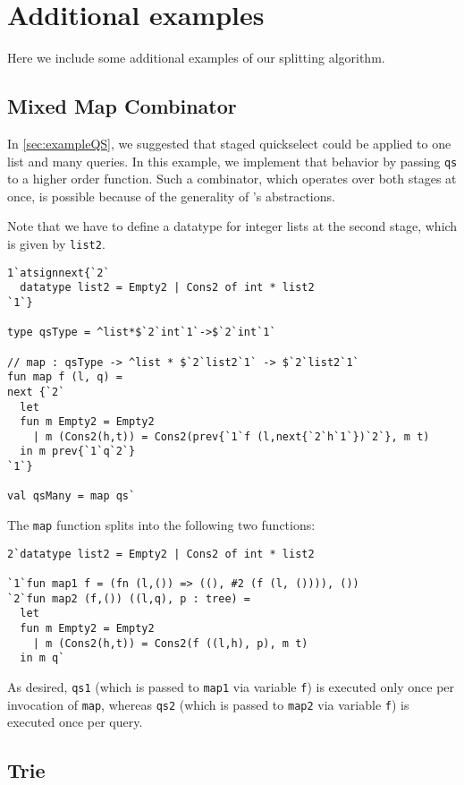 
\section{Additional examples}

Here we include some additional examples of our splitting algorithm.

\subsection {Mixed Map Combinator}

In \ref{sec:exampleQS}, we suggested that staged quickselect could be applied to one list and many queries.
In this example, we implement that behavior by passing \texttt{qs} to a higher order function.
Such a combinator, which operates over both stages at once, is possible because of the generality of \lang's abstractions.

Note that we have to define a datatype for integer lists at the second stage, which is given by \texttt{list2}.
\begin{lstlisting} 
1`atsignnext{`2`
  datatype list2 = Empty2 | Cons2 of int * list2
`1`}

type qsType = ^list*$`2`int`1`->$`2`int`1`

// map : qsType -> ^list * $`2`list2`1` -> $`2`list2`1`
fun map f (l, q) = 
next {`2`
  let 
  fun m Empty2 = Empty2
    | m (Cons2(h,t)) = Cons2(prev{`1`f (l,next{`2`h`1`})`2`}, m t)
  in m prev{`1`q`2`}
`1`}

val qsMany = map qs`
\end{lstlisting}
The \texttt{map} function splits into the following two functions:
\begin{lstlisting} 
2`datatype list2 = Empty2 | Cons2 of int * list2

`1`fun map1 f = (fn (l,()) => ((), #2 (f (l, ()))), ())
`2`fun map2 (f,()) ((l,q), p : tree) =
  let 
  fun m Empty2 = Empty2
    | m (Cons2(h,t)) = Cons2(f ((l,h), p), m t) 
  in m q`
\end{lstlisting}

As desired, \texttt{qs1} (which is passed to \texttt{map1} via variable \texttt{f}) is executed only once per invocation of \texttt{map},
whereas \texttt{qs2} (which is passed to \texttt{map2} via variable \texttt{f}) is executed once per query.

\subsection{Trie}

